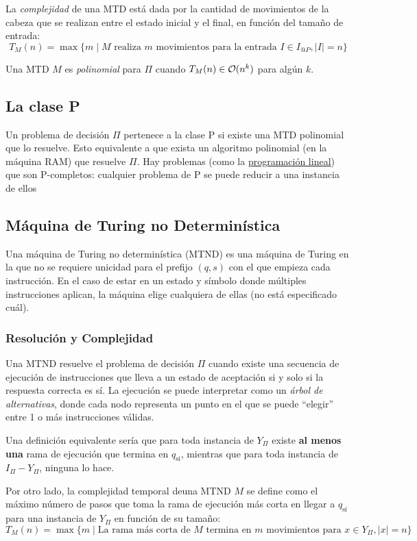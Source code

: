 La \textit{complejidad} de una MTD está dada por la cantidad de movimientos de la cabeza que se realizan entre el estado inicial y el final, en función del tamaño de entrada:
$$T_M(n) = \max\{m \mid M \text{ realiza $m$ movimientos para la entrada $I \in I_{@P}, |I| = n$}\}$$

Una MTD $M$ es \textit{polinomial} para $\Pi$ cuando $T_M(n) \in \mathcal{O}(n^k)$ para algún $k$.

\subsection{La clase P}

Un problema de decisión $\Pi$ pertenece a la clase P si existe una MTD polinomial que lo resuelve. Esto equivalente a que exista un algoritmo polinomial (en la máquina RAM) que resuelve $\Pi$. Hay problemas (como la \hyperref[programacion-lineal]{programación lineal}) que son P-completos: cualquier problema de P se puede reducir a una instancia de ellos

\subsection{Máquina de Turing no Determinística}

Una máquina de Turing no determinística (MTND) es una máquina de Turing en la que no se requiere unicidad para el prefijo $(q, s)$ con el que empieza cada instrucción. En el caso de estar en un estado y símbolo donde múltiples instrucciones aplican, la máquina elige cualquiera de ellas (no está especificado cuál).

\subsubsection{Resolución y Complejidad}

Una MTND resuelve el problema de decisión $\Pi$ cuando existe una secuencia de ejecución de instrucciones que lleva a un estado de aceptación si y solo si la respuesta correcta es sí. La ejecución se puede interpretar como un \textit{árbol de alternativas}, donde cada nodo representa un punto en el que se puede ``elegir'' entre 1 o más instrucciones válidas.

Una definición equivalente sería que para toda instancia de $Y_{\Pi}$ existe \textbf{al menos una} rama de ejecución que termina en $q_{\text{sí}}$, mientras que para toda instancia de $I_{\Pi} - Y_{\Pi}$, ninguna lo hace.

Por otro lado, la complejidad temporal deuna MTND $M$ se define como el máximo número de pasos que toma la rama de ejecución más corta en llegar a $q_{\text{sí}}$ para una instancia de $Y_{\Pi}$ en función de su tamaño:
$$T_M(n) = \max\{m \mid \text{La rama más corta de $M$ termina en $m$ movimientos para $x \in Y_{\Pi}, |x| = n$}\}$$

